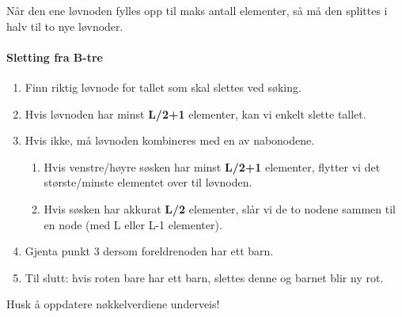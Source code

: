 \documentclass[11pt,a4paper]{article}
\theoremstyle{def}
\begin{document}
\begin{minipage}{0.5\textwidth}
\end{minipage}

Når den ene løvnoden fylles opp til maks antall elementer, så må den splittes i halv til to nye løvnoder.


\paragraph{Sletting fra B-tre}
\begin{enumerate}
\item
Finn riktig løvnode for tallet som skal slettes ved søking.
\item
Hvis løvnoden har minst \textbf{L/2+1} elementer, kan vi enkelt slette tallet.
\item
Hvis ikke, må løvnoden kombineres med en av nabonodene.
\begin{enumerate}
\item
Hvis venstre/høyre søsken har minst \textbf{L/2+1} elementer, flytter vi det største/minste elementet over til løvnoden.
\item
Hvis søsken har akkurat \textbf{L/2} elementer, slår vi de to nodene sammen til en node (med L eller L-1 elementer).
\end{enumerate}
\item
Gjenta punkt 3 dersom foreldrenoden har ett barn.
\item
Til slutt: hvis roten bare har ett barn, slettes denne og barnet blir ny rot.
\end{enumerate}
Husk å oppdatere nøkkelverdiene underveis!
\end{document}
